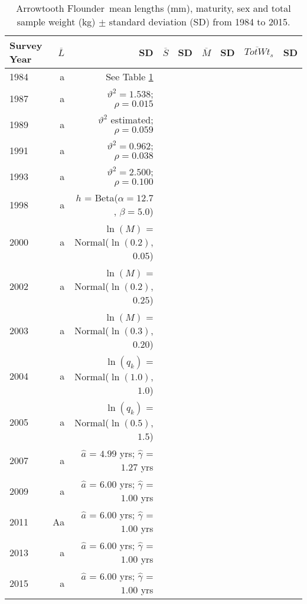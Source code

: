 \documentclass[11pt]{book}\usepackage[]{graphicx}\usepackage[]{color}
\makeatletter
\newcommand{\specialcell}[2][c]{\begin{tabular}[#1]{@{}c@{}}#2\end{tabular}}
\newcommand{\fishnameARF}{Arrowtooth Flounder}
\makeatother
\begin{document}
\newpage

\begin{table}[H]
\centering
\caption{\label{tab:annmeansSD}\fishnameARF\ mean lengths (mm), maturity, sex and total sample weight (kg) ${\pm}$ standard deviation (SD) from 1984 to 2015.}
\begin{tabular}{lrrrrrrrr}%
\hline
\textbf{Survey Year} & \textbf{$\overline{L}$} & \textbf{SD} & \textbf{$\overline{S}$} & \textbf{SD} & \textbf{$\overline{M}$} & \textbf{SD} & \textbf{$\overline{TotWt}_s$} & \textbf{SD}\\ 
\hline
1984           & a                               & See Table \ref{tab:annmeansSD} \\
1987             & a                      & $\vartheta^2=1.538$; $\rho=0.015$ \\
1989             & a                       & $\vartheta^2$ estimated; $\rho=0.059$ \\
1991             & a                        & $\vartheta^2=0.962$; $\rho=0.038$ \\
1993             & a                       & $\vartheta^2=2.500$; $\rho=0.100$ \\
1998             & a            & $h$ = Beta($\alpha=12.7$, $\beta=5.0$) \\
2000             & a          & $\ln(M)$ = Normal($\ln(0.2)$, $0.05$) \\
2002             & a          & $\ln(M)$ = Normal($\ln(0.2)$, $0.25$) \\
2003           & a        & $\ln(M)$ = Normal($\ln(0.3)$, $0.20$) \\
2004          & a         & $\ln(q_k)$ = Normal($\ln(1.0)$, $1.0$) \\
2005          & a         & $\ln(q_k)$ = Normal($\ln(0.5)$, $1.5$) \\
2007          & a            & $\hat{a}$ = $4.99$ yrs; $\hat{\gamma}$ = $1.27$ yrs \\
2009          & a              & $\hat{a}$ = $6.00$ yrs; $\hat{\gamma}$ = $1.00$ yrs \\
2011         & Aa              & $\hat{a}$ = $6.00$ yrs; $\hat{\gamma}$ = $1.00$ yrs \\
2013          & a              & $\hat{a}$ = $6.00$ yrs; $\hat{\gamma}$ = $1.00$ yrs \\
2015         & a              & $\hat{a}$ = $6.00$ yrs; $\hat{\gamma}$ = $1.00$ yrs \\
\hline
\end{tabular}
\end{table}
\end{document}
